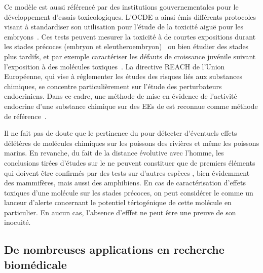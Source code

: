 \documentclass[\main/main.tex]{subfiles}
\begin{document}
%
Ce modèle est aussi référencé par des institutions gouvernementales pour le développement d'essais toxicologiques.
%
L'OCDE a ainsi émis différents protocoles visant à standardiser son utilisation pour l'étude de la toxicité aiguë pour les embryons~\cite{oecd_2013}. Ces tests peuvent mesurer la toxicité à de courtes expositions durant les stades précoces (embryon et eleutheroembryon)~\cite{oecd_2013a} ou bien étudier  des stades plus tardifs, et par exemple caractériser les défauts de croissance juvénile suivant l'exposition à des molécules toxiques~\cite{oecd_2000}.
%
La directive REACH de l'Union Européenne, qui vise à réglementer les études des risques liés aux substances chimiques, se concentre particulièrement sur l'étude des perturbateurs endocriniens.
%
Dans ce cadre, une méthode de mise en évidence de l'activité endocrine d'une substance chimique sur des EEs de \pz{} est reconnue comme méthode de référence~\cite{europeanchemicalagencyechaandeuropeanfoodsafetyauthorityefsawiththetechnicalsupportofthejointresearchcentrejrc_2018}.

Il ne fait pas de doute que le  pertinence du \pz{} pour détecter d'éventuels effets délétères de molécules chimiques sur les poissons des rivières et même les poissons marins. En revanche, du fait de la distance évolutive avec l'homme, les conclusions tirées d'études sur le \pz{} ne peuvent constituer que de premiers éléments  qui doivent être confirmés par des tests sur d'autres espèces , bien évidemment des mammifères, mais aussi des amphibiens. En cas de caractérisation d'effets toxiques d'une molécule sur les stades précoces, on peut considérer le \pz{} comme un lanceur d'alerte concernant le potentiel tértogénique de cette molécule en particulier. En aucun cas, l'absence d'efffet ne peut être une preuve de son inocuité. 
    
    \subsection{De nombreuses applications en recherche biomédicale}
\end{document}
